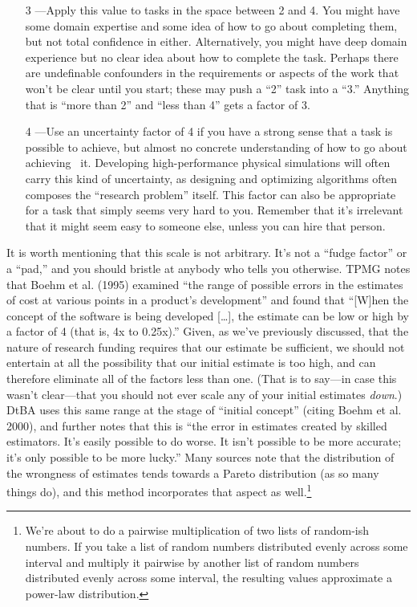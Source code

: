 \documentclass[12pt,oneside]{book}
\begin{document}
\begin{itemize}[wide, labelwidth=!, labelindent=0pt, font=\bfseries]
\item[3]---Apply this value to tasks in the space between 2 and 4. You might have some domain expertise and some idea of how to go about completing them, but not total confidence in either. Alternatively, you might have deep domain experience but no clear idea about how to complete the task. Perhaps there are undefinable confounders in the requirements or aspects of the work that won't be clear until you start; these may push a ``2'' task into a ``3.'' Anything that is ``more than 2'' and ``less than 4'' gets a factor of 3.

\item[4]---Use an uncertainty factor of 4 if you have a strong sense that a task is possible to achieve, but almost no concrete understanding of how to go about achieving  it. Developing high-performance physical simulations will often carry this kind of uncertainty, as designing and optimizing algorithms often composes the ``research problem'' itself. This factor can also be appropriate for a task that simply seems very hard to you. Remember that it's irrelevant that it might seem easy to someone else, unless you can hire that person.
\end{itemize}

It is worth mentioning that this scale is not arbitrary. It's not a ``fudge factor'' or a ``pad,'' and you should bristle at anybody who tells you otherwise. TPMG notes that Boehm et al. (1995) examined ``the range of possible errors in the estimates of cost at various points in a product's development'' and found that ``[W]hen the concept of the software is being developed [{\ldots}], the estimate can be low or high by a factor of 4 (that is, 4x to 0.25x).'' Given, as we've previously discussed, that the nature of research funding requires that our estimate be sufficient, we should not entertain at all the possibility that our initial estimate is too high, and can therefore eliminate all of the factors less than one. (That is to say---in case this wasn't clear---that you should not ever scale any of your initial estimates \emph{down}.) DtBA uses this same range at the stage of ``initial concept'' (citing Boehm et al. 2000), and further notes that this is ``the error in estimates created by skilled estimators. It's easily possible to do worse. It isn't possible to be more accurate; it's only possible to be more lucky.'' Many sources note that the distribution of the wrongness of estimates tends towards a Pareto distribution (as so many things do), and this method incorporates that aspect as well.\footnote{
We're about to do a pairwise multiplication of two lists of random-ish numbers. If you take a list of random numbers distributed evenly across some interval and multiply it pairwise by another list of random numbers distributed evenly across some interval, the resulting values approximate a power-law distribution.}
\end{document}
